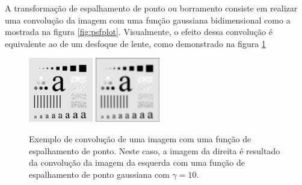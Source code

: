 A transformação de espalhamento de ponto ou borramento consiste em realizar uma convolução da imagem com uma função gaussiana bidimensional como a mostrada na figura \ref{fig:psfplot}.
Visualmente, o efeito dessa convolução é equivalente ao de um desfoque de lente, como demonstrado na figura \ref{fig:psfexample}

\begin{figure}[H]
	\centering
	\caption{\label{fig:psfexample}Exemplo de convolução de uma imagem com uma função de espalhamento de ponto.
	Neste caso, a imagem da direita é resultado da convolução da imagem da esquerda com uma função de espalhamento de ponto gaussiana com $\gamma = 10$.}
	\includegraphics[width = 0.25\textwidth]{./figures/psfexample0.png}
	\includegraphics[width = 0.25\textwidth]{./figures/psfexample1.png}
\end{figure}

